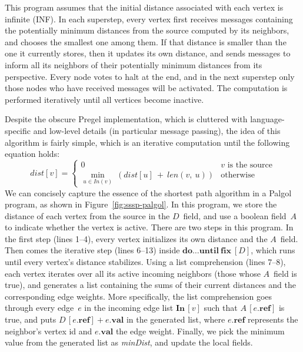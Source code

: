 \documentclass{sokendai_thesis} %
\begin{document}
This program assumes that the initial distance associated with each vertex is infinite (INF).
In each superstep, every vertex first receives messages containing the potentially minimum distances from the source computed by its neighbors, and chooses the smallest one among them.
If that distance is smaller than the one it currently stores, then it updates its own distance, and sends messages to inform all its neighbors of their potentially minimum distances from its perspective.
Every node votes to halt at the end, and in the next superstep only those nodes who have received messages will be activated.
The computation is performed iteratively until all vertices become inactive.

Despite the obscure Pregel implementation, which is cluttered with language-specific and low-level details (in particular message passing), the idea of this algorithm is fairly simple, which is an iterative computation until the following equation holds:
$$ \mathit{dist}[v] =\begin{cases}0 & \text{$v$~is the source} \\ \min_{u\in \mathit{In}(v)}~(\mathit{dist}[u]~+~\mathit{len}(v,~u)) & \text{otherwise} \end{cases} $$
We can concisely capture the essence of the shortest path algorithm in a Palgol program, as shown in Figure~\ref{fig:sssp-palgol}.
In this program, we store the distance of each vertex from the source in the $D$~field, and use a boolean field~$A$ to indicate whether the vertex is active.
There are two steps in this program.
In the first step (lines 1--4), every vertex initializes its own distance and the $A$~field.
Then comes the iterative step (lines 6--13) inside $\mathbf{do} \ldots \mathbf{until}~\mathbf{fix}~[D]$, which runs until every vertex's distance stabilizes.
Using a list comprehension (lines 7--8), each vertex iterates over all its active incoming neighbors (those whose $A$~field is true), and generates a list containing the sums of their current distances and the corresponding edge weights.
More specifically, the list comprehension goes through every edge~$e$ in the incoming edge list $\mathbf{In}\,[v]$ such that $A\,[e.\mathbf{ref}]$ is true, and puts $D\,[e.\mathbf{ref}] + e.\mathbf{val}$ in the generated list, where $e.\mathbf{ref}$ represents the neighbor's vertex id and $e.\mathbf{val}$ the edge weight.
Finally, we pick the minimum value from the generated list as \textit{minDist}, and update the local fields.
\end{document}
